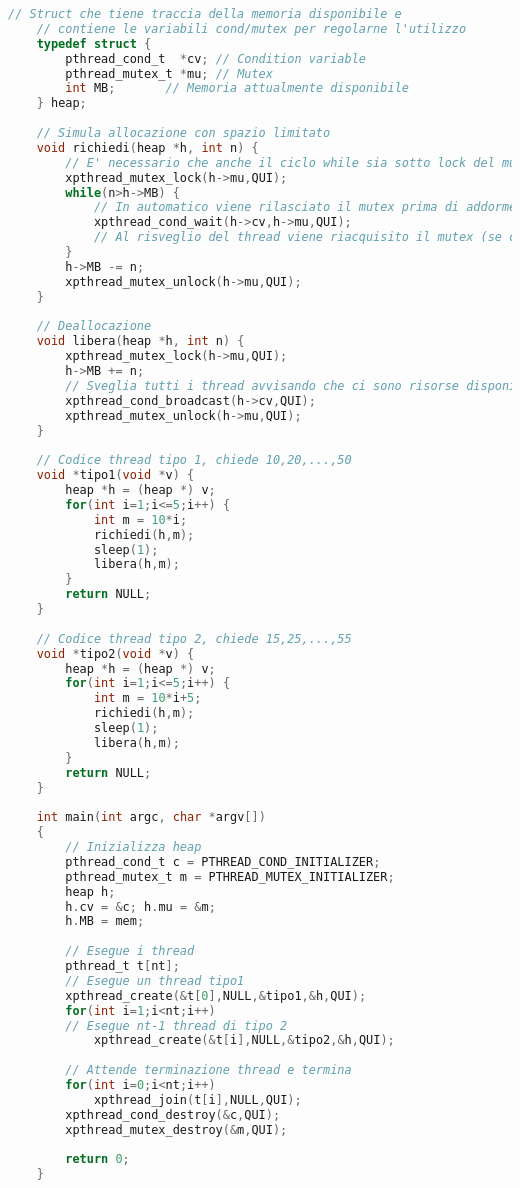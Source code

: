 \begin{lstlisting}[language=C]
	// Struct che tiene traccia della memoria disponibile e 
	// contiene le variabili cond/mutex per regolarne l'utilizzo
	typedef struct {
		pthread_cond_t  *cv; // Condition variable
		pthread_mutex_t *mu; // Mutex
		int MB;       // Memoria attualmente disponibile
	} heap;
	
	// Simula allocazione con spazio limitato
	void richiedi(heap *h, int n) {
		// E' necessario che anche il ciclo while sia sotto lock del mutex
		xpthread_mutex_lock(h->mu,QUI);
		while(n>h->MB) {
			// In automatico viene rilasciato il mutex prima di addormentarsi
			xpthread_cond_wait(h->cv,h->mu,QUI);
			// Al risveglio del thread viene riacquisito il mutex (se ce ne sono diversi in attesa, il piu veloce lo prende, gli altri attendono)
		}
		h->MB -= n;
		xpthread_mutex_unlock(h->mu,QUI);
	}
	
	// Deallocazione
	void libera(heap *h, int n) {
		xpthread_mutex_lock(h->mu,QUI);
		h->MB += n;
		// Sveglia tutti i thread avvisando che ci sono risorse disponibili
		xpthread_cond_broadcast(h->cv,QUI);
		xpthread_mutex_unlock(h->mu,QUI); 
	}
	
	// Codice thread tipo 1, chiede 10,20,...,50
	void *tipo1(void *v) {
		heap *h = (heap *) v;
		for(int i=1;i<=5;i++) {
			int m = 10*i;
			richiedi(h,m);
			sleep(1);
			libera(h,m);
		}
		return NULL;
	}
	
	// Codice thread tipo 2, chiede 15,25,...,55
	void *tipo2(void *v) {
		heap *h = (heap *) v;
		for(int i=1;i<=5;i++) {
			int m = 10*i+5;
			richiedi(h,m);
			sleep(1);
			libera(h,m);
		}
		return NULL;
	}
	
	int main(int argc, char *argv[])
	{		
		// Inizializza heap 
		pthread_cond_t c = PTHREAD_COND_INITIALIZER;
		pthread_mutex_t m = PTHREAD_MUTEX_INITIALIZER;
		heap h;
		h.cv = &c; h.mu = &m;
		h.MB = mem;
		
		// Esegue i thread
		pthread_t t[nt];
		// Esegue un thread tipo1
		xpthread_create(&t[0],NULL,&tipo1,&h,QUI);
		for(int i=1;i<nt;i++)
		// Esegue nt-1 thread di tipo 2
			xpthread_create(&t[i],NULL,&tipo2,&h,QUI);
		
		// Attende terminazione thread e termina
		for(int i=0;i<nt;i++)
			xpthread_join(t[i],NULL,QUI);
		xpthread_cond_destroy(&c,QUI);
		xpthread_mutex_destroy(&m,QUI);
		
		return 0;
	}
\end{lstlisting}

